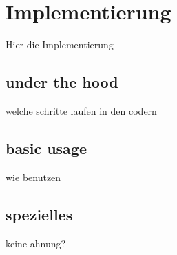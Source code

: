 
\chapter{Implementierung}
Hier die Implementierung

\section{under the hood}
welche schritte laufen in den codern

\section{basic usage}
wie benutzen

\section{spezielles}
keine ahnung?

